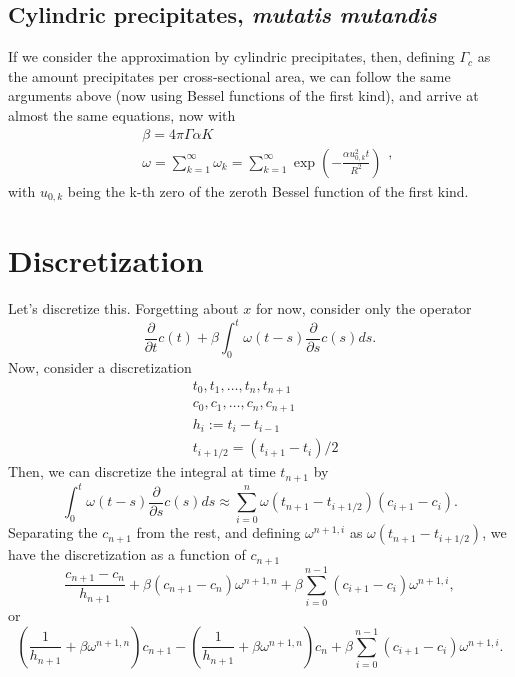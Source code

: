 \documentclass[]{article}
\newcommand{\pderiv}[2]{\frac{\partial #1}{\partial #2}}
\begin{document}
\subsection{Cylindric precipitates, \textit{mutatis mutandis}}
If we consider the approximation by cylindric precipitates, then, defining $\Gamma_c$ as the amount precipitates per cross-sectional area, we can follow the same arguments above (now using Bessel functions of the first kind), and arrive at almost the same equations, now with
\begin{equation}
	\begin{split}
		& \beta = 4 \pi \Gamma \alpha K \\
		& \omega = \sum_{k=1}^\infty \omega_k = \sum_{k=1}^\infty \exp \left( -\frac{\alpha u_{0, k}^2 t}{R^2} \right)
	\end{split},
\end{equation}
with $u_{0, k}$ being the k-th zero of the zeroth Bessel function of the first kind.

\section{Discretization}
Let's discretize this. Forgetting about $x$ for now, consider only the operator
\begin{equation}
	\pderiv{}{t} c(t) + \beta \int_0^t \omega(t - s) \pderiv{}{s} c(s) ds.
\end{equation}
Now, consider a discretization
\begin{equation}
	\begin{split}
	& t_0, t_1, \ldots, t_n, t_{n+1} \\
	& c_0, c_1, \ldots, c_n, c_{n+1} \\
	& h_i := t_{i} - t_{i-1} \\
	& t_{i+1/2} = (t_{i+1} - t_{i})/2
	\end{split}
\end{equation}
Then, we can discretize the integral at time $t_{n+1}$ by
\begin{equation}
	\int_0^t \omega(t - s) \pderiv{}{s} c(s) ds \approx \sum_{i=0}^n \omega(t_{n+1} - t_{i+{1/2}}) (c_{i+1} - c_{i}).
\end{equation}
Separating the $c_{n+1}$ from the rest, and defining $\omega^{n+1, i}$ as $\omega(t_{n+1} - t_{i+{1/2}})$, we have the discretization as a function of $c_{n+1}$
\begin{equation}
	\frac{c_{n+1} - c_{n}}{h_{n+1}} + \beta (c_{n+1} - c_n) \omega^{n+1, n} + \beta \sum_{i=0}^{n-1} (c_{i+1} - c_i) \omega^{n+1, i},
\end{equation}
or
\begin{equation}
	\left(\frac{1}{h_{n+1}} + \beta \omega^{n+1, n} \right) c_{n+1} - \left(\frac{1}{h_{n+1}} + \beta \omega^{n+1, n} \right) c_{n} + \beta \sum_{i=0}^{n-1} (c_{i+1} - c_i) \omega^{n+1, i}.
\end{equation}
\end{document}
